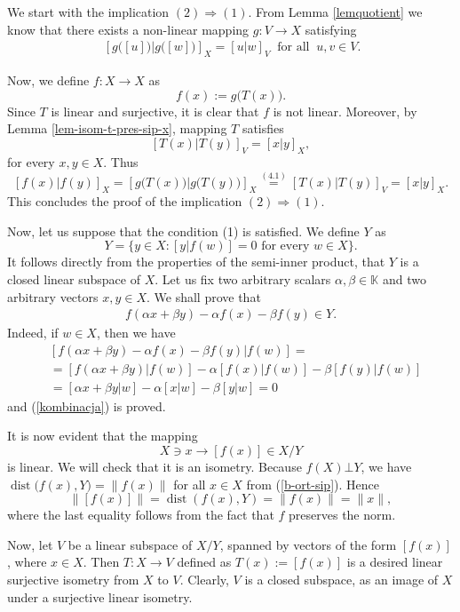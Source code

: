 \documentclass[12pt, reqno]{amsart}
\theoremstyle{definition}
\theoremstyle{remark}
\numberwithin{equation}{section}
\newcommand{\sip}[2]{\left[#1|#2\right]}
\DeclareMathOperator{\dist}{dist}
\begin{document}
We start with the implication $(2) \Rightarrow (1)$. From Lemma \ref{lemquotient} we know that there exists a non-linear mapping  $g: V \to X$ satisfying
\begin{align}
\ \sip{ g\big([u]\big)}{g\big([w]\big)}_X=\sip{u}{w}_V \: \text{ for all } \: u, v \in V.
\end{align}

Now, we define $f\colon X \to X$ as
$$f(x):= g\big(T(x)\big).$$
Since $T$ is linear and surjective, it is clear that $f$ is not linear. Moreover, by Lemma \ref{lem-isom-t-pres-sip-x}, mapping $T$ satisfies
$$\sip{T(x)}{T(y)}_V = \sip{x}{y}_X,$$
for every $x, y \in X$. Thus
$$\sip{f(x)}{f(y)}_X = \sip{g\big(T(x)\big)}{g\big(T(y)\big)}_X\stackrel{(4.1)}{=}\sip{T(x)}{T(y)}_V=\sip{x}{y}_X.$$
This concludes the proof of the implication $(2) \Rightarrow (1)$.

Now, let us suppose that the condition (1) is satisfied. We define $Y$ as
$$Y = \{ y \in X : \sip{y}{f(w)} = 0 \text{ for every } w \in X \}.$$
It follows directly from the properties of the semi-inner product, that $Y$ is a closed linear subspace of $X$. Let us fix two arbitrary scalars $\alpha, \beta \in \mathbb{K}$ and two arbitrary vectors $x, y \in X$. We shall prove that
\begin{align}
\label{kombinacja}
f(\alpha x + \beta y) - \alpha f(x) - \beta f(y) \in Y.
\end{align}
Indeed, if $w\in X$, then we have
\begin{align*}
&\sip{f(\alpha x + \beta y) - \alpha f(x) - \beta f(y)}{f(w)}=\\
&=
\sip{f(\alpha x + \beta y)}{f(w)}-
\alpha\sip{f(x)}{f(w)}-
\beta\sip{f(y)}{f(w)}\\
&=
\sip{\alpha x + \beta y}{w}-
\alpha\sip{x}{w}-
\beta\sip{y}{w}=0
\end{align*}
and (\ref{kombinacja}) is proved.

It is now evident that the mapping
$$X \ni x \to [f(x)] \in X/Y$$
is linear.  We will check that it is an isometry. Because $f(X)\bot Y$, we have $\dist\big(f(x),Y\big)=\|f(x)\|$ for all $x\in X$ from (\ref{b-ort-sip}). Hence
$$\big\|[f(x)]\big\| = \dist(f(x), Y) =\|f(x)\| = \|x\|,$$
where the last equality follows from the fact that $f$ preserves the norm.

Now, let $V$ be a linear subspace of $X/Y$, spanned by vectors of the form $[f(x)]$, where $x \in X$. Then $T\colon X \to V$ defined as $T(x):=[f(x)]$ is a desired linear surjective isometry from $X$ to $V$. Clearly, $V$ is a closed subspace, as an image of $X$ under a surjective linear isometry.
\end{document}
